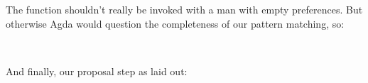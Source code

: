 {The function shouldn't really be invoked with a man with empty preferences. But otherwise Agda would question the completeness of our pattern matching, so:

\begin{code}%
\>[0]%
\>[790I]\AgdaSymbol{(}\AgdaSpace{}%
\AgdaSpace{}%
\AgdaSymbol{((}\AgdaSpace{}%
\AgdaOperator{\AgdaInductiveConstructor{,}}\AgdaSpace{}%
\AgdaInductiveConstructor{[]}\AgdaSymbol{)}\AgdaSpace{}%
\AgdaSpace{}%
\AgdaSymbol{)}\AgdaSpace{}%
\AgdaSpace{}%
\AgdaSpace{}%
\AgdaSpace{}%
\AgdaSpace{}%
\AgdaSymbol{)}\AgdaSpace{}%
\AgdaSymbol{=}\<%
\\
\>[.][@{}l@{}]\<[790I]%
\>[5]\AgdaSpace{}%
\AgdaSpace{}%
\AgdaSpace{}%
\AgdaSpace{}%
\AgdaSpace{}%
\AgdaSpace{}%
\AgdaSpace{}%
\<%
\end{code}

And finally, our proposal step as laid out:

}
